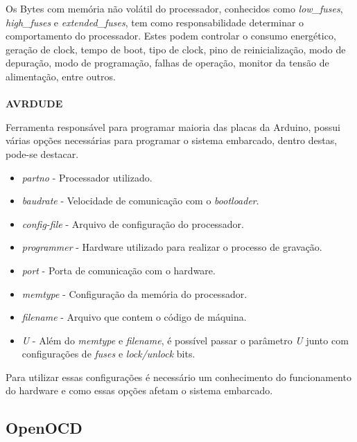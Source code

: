 Os Bytes com memória não volátil do processador, conhecidos como \textit{low\_fuses}, \textit{high\_fuses} e \textit{extended\_fuses}, tem como responsabilidade determinar o comportamento do processador. Estes podem controlar o consumo energético, geração de clock, tempo de boot, tipo de clock, pino de reinicialização, modo de depuração, modo de programação, falhas de operação, monitor da tensão de alimentação, entre outros\cite{fuseSettings}\cite{fuses}.
\\
\\
\textbf{AVRDUDE}

Ferramenta responsável para programar maioria das placas da Arduino, possui várias opções necessárias para programar o sistema embarcado, dentro destas, pode-se destacar.

\begin{itemize}
\item \textit{partno} - Processador utilizado.

\item \textit{baudrate} - Velocidade de comunicação com o \textit{bootloader}.

\item \textit{config-file} - Arquivo de configuração do processador.

\item \textit{programmer} - Hardware utilizado para realizar o processo de gravação.

\item \textit{port} - Porta de comunicação com o hardware.

\item \textit{memtype} - Configuração da memória do processador.

\item \textit{filename} - Arquivo que contem o código de máquina.

\item \textit{U} - Além do \textit{memtype} e \textit{filename}, é possível passar o parâmetro \textit{U} junto com configurações de \textit{fuses} e \textit{lock/unlock} bits.
\end{itemize}

Para utilizar essas configurações é necessário um conhecimento do funcionamento do hardware e como essas opções afetam o sistema embarcado. 

\subsection{OpenOCD}

